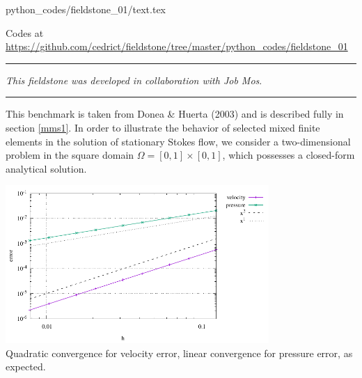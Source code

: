 \begin{flushright} {\tiny {\color{gray} python\_codes/fieldstone\_01/text.tex}} \end{flushright}



\begin{center}

Codes at \url{https://github.com/cedrict/fieldstone/tree/master/python_codes/fieldstone_01}
\end{center}

\par\noindent\rule{\textwidth}{0.4pt}

{\sl This fieldstone was developed in collaboration with Job Mos}. 

\par\noindent\rule{\textwidth}{0.4pt}

This benchmark is taken from Donea \& Huerta (2003) \cite{dohu03} and is described fully in section \ref{mms1}. 
In order to illustrate the behavior of selected mixed finite elements in the solution 
of stationary Stokes flow,  we consider a two-dimensional problem 
in the square domain $\Omega=[0,1]\times[0,1]$, which possesses a closed-form analytical 
solution. 

\begin{center}
\includegraphics[width=10cm]{python_codes/fieldstone_01/results/errors.pdf}\\
{\captionfont Quadratic convergence for velocity error, 
linear convergence for pressure error, as expected.}
\end{center}

